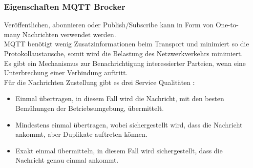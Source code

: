 \subsubsection{Eigenschaften MQTT Brocker}
Veröffentlichen, abonnieren oder  Publish/Subscribe kann in Form von One-to-many Nachrichten verwendet werden.\\
MQTT benötigt wenig Zusatzinformationen beim Transport und minimiert so die Protokollaustausche, somit wird die Belastung des Netzwerkverkehrs minimiert.\\
Es gibt ein Mechanismus zur Benachrichtigung interessierter Parteien, wenn eine Unterbrechung einer Verbindung auftritt.\\
Für die Nachrichten Zustellung gibt es drei Service Qualitäten \cite{noauthor_mqtt-v5.0.pdf_nodate}:\\
\begin{itemize}
	\item Einmal übertragen, in diesem Fall wird die Nachricht, mit den besten Bemühungen der Betriebsumgebung, übermittelt.\\
		\item Mindestens einmal übertragen, wobei sichergestellt wird, dass die Nachricht ankommt, aber Duplikate auftreten können.\\
	\item Exakt einmal übermitteln, in diesem Fall wird sichergestellt, dass die Nachricht genau einmal ankommt.
\end{itemize}


